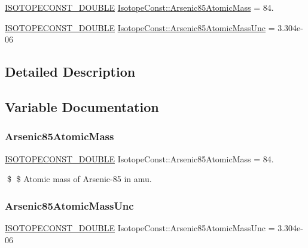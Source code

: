 \begin{DoxyCompactItemize}
\item 
\mbox{\hyperlink{group___isotope_const-_macros_ga8f45a7272ce02c0b4c65c44636ed719a}{I\+S\+O\+T\+O\+P\+E\+C\+O\+N\+S\+T\+\_\+\+D\+O\+U\+B\+LE}} \mbox{\hyperlink{group___isotope_const-_arsenic-_as85_ga2744ffac977aa2e71282bce5410e2d87}{Isotope\+Const\+::\+Arsenic85\+Atomic\+Mass}} = 84.
\item 
\mbox{\hyperlink{group___isotope_const-_macros_ga8f45a7272ce02c0b4c65c44636ed719a}{I\+S\+O\+T\+O\+P\+E\+C\+O\+N\+S\+T\+\_\+\+D\+O\+U\+B\+LE}} \mbox{\hyperlink{group___isotope_const-_arsenic-_as85_ga82639d9f261e813a58a4ee5dae2015cc}{Isotope\+Const\+::\+Arsenic85\+Atomic\+Mass\+Unc}} = 3.\+304e-\/06
\end{DoxyCompactItemize}


\subsection{Detailed Description}


\subsection{Variable Documentation}
\mbox{\label{group___isotope_const-_arsenic-_as85_ga2744ffac977aa2e71282bce5410e2d87}} 
\subsubsection{\texorpdfstring{Arsenic85\+Atomic\+Mass}{Arsenic85AtomicMass}}
{\footnotesize\ttfamily \mbox{\hyperlink{group___isotope_const-_macros_ga8f45a7272ce02c0b4c65c44636ed719a}{I\+S\+O\+T\+O\+P\+E\+C\+O\+N\+S\+T\+\_\+\+D\+O\+U\+B\+LE}} Isotope\+Const\+::\+Arsenic85\+Atomic\+Mass = 84.}

\$ \$ Atomic mass of Arsenic-\/85 in amu. \mbox{\label{group___isotope_const-_arsenic-_as85_ga82639d9f261e813a58a4ee5dae2015cc}} 
\subsubsection{\texorpdfstring{Arsenic85\+Atomic\+Mass\+Unc}{Arsenic85AtomicMassUnc}}
{\footnotesize\ttfamily \mbox{\hyperlink{group___isotope_const-_macros_ga8f45a7272ce02c0b4c65c44636ed719a}{I\+S\+O\+T\+O\+P\+E\+C\+O\+N\+S\+T\+\_\+\+D\+O\+U\+B\+LE}} Isotope\+Const\+::\+Arsenic85\+Atomic\+Mass\+Unc = 3.\+304e-\/06}

